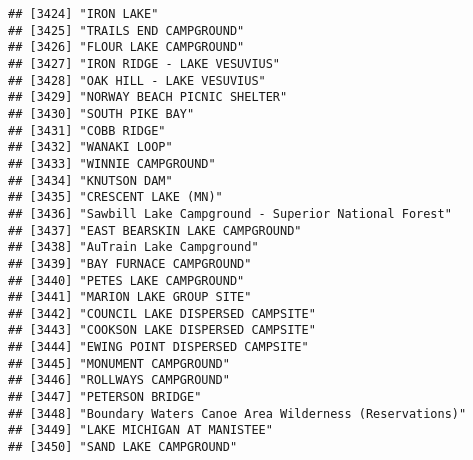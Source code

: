 \documentclass[
]{article}
\begin{document}
\begin{verbatim}
## [3424] "IRON LAKE"                                                                           
## [3425] "TRAILS END CAMPGROUND"                                                               
## [3426] "FLOUR LAKE CAMPGROUND"                                                               
## [3427] "IRON RIDGE - LAKE VESUVIUS"                                                          
## [3428] "OAK HILL - LAKE VESUVIUS"                                                            
## [3429] "NORWAY BEACH PICNIC SHELTER"                                                         
## [3430] "SOUTH PIKE BAY"                                                                      
## [3431] "COBB RIDGE"                                                                          
## [3432] "WANAKI LOOP"                                                                         
## [3433] "WINNIE CAMPGROUND"                                                                   
## [3434] "KNUTSON DAM"                                                                         
## [3435] "CRESCENT LAKE (MN)"                                                                  
## [3436] "Sawbill Lake Campground - Superior National Forest"                                  
## [3437] "EAST BEARSKIN LAKE CAMPGROUND"                                                       
## [3438] "AuTrain Lake Campground"                                                             
## [3439] "BAY FURNACE CAMPGROUND"                                                              
## [3440] "PETES LAKE CAMPGROUND"                                                               
## [3441] "MARION LAKE GROUP SITE"                                                              
## [3442] "COUNCIL LAKE DISPERSED CAMPSITE"                                                     
## [3443] "COOKSON LAKE DISPERSED CAMPSITE"                                                     
## [3444] "EWING POINT DISPERSED CAMPSITE"                                                      
## [3445] "MONUMENT CAMPGROUND"                                                                 
## [3446] "ROLLWAYS CAMPGROUND"                                                                 
## [3447] "PETERSON BRIDGE"                                                                     
## [3448] "Boundary Waters Canoe Area Wilderness (Reservations)"                                
## [3449] "LAKE MICHIGAN AT MANISTEE"                                                           
## [3450] "SAND LAKE CAMPGROUND"                                                                

\end{verbatim}
\end{document}
